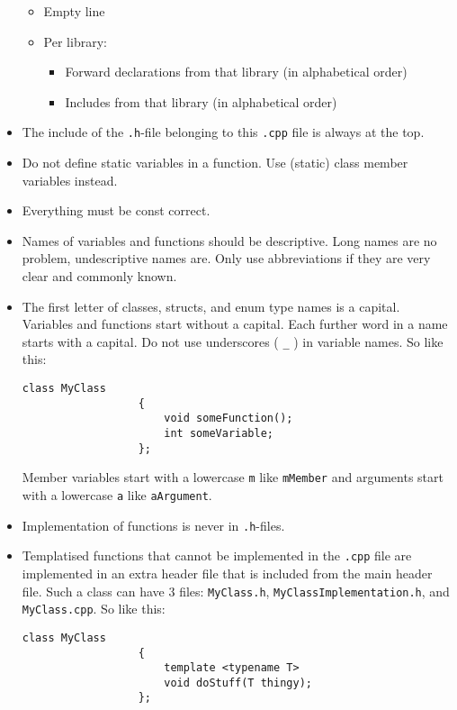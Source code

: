 \documentclass{article}
\begin{document}
\begin{itemize}
\begin{itemize}
              \item Empty line
              \item Per library:
                    \begin{itemize}
                        \item Forward declarations from that library (in alphabetical order)
                        \item Includes from that library (in alphabetical order)
                    \end{itemize}
          \end{itemize}
    \item The include of the \texttt{.h}-file belonging to this \texttt{.cpp} file is always at the top.
    \item Do not define static variables in a function. Use (static) class member variables instead.
    \item Everything must be const correct.
    \item Names of variables and functions should be descriptive. Long names are no problem, undescriptive names are. Only use abbreviations if they are very clear and commonly known.
    \item The first letter of classes, structs, and enum type names is a capital. Variables and functions start without a capital. Each further word in a name starts with a capital. Do not use underscores ( \texttt{\_} ) in variable names. So like this:
          \begin{Verbatim}[fontsize=\small]
              class MyClass
                  {
                      void someFunction();
                      int someVariable;
                  };
          \end{Verbatim}
          Member variables start with a lowercase \texttt{m} like \texttt{mMember} and arguments start with a lowercase \texttt{a} like \texttt{aArgument}.
    \item Implementation of functions is never in \texttt{.h}-files.
    \item Templatised functions that cannot be implemented in the \texttt{.cpp} file are implemented in an extra header file that is included from the main header file. Such a class can have 3 files: \texttt{MyClass.h}, \texttt{MyClassImplementation.h}, and \texttt{MyClass.cpp}. So like this:
          \begin{Verbatim}[fontsize=\small]
              class MyClass
                  {
                      template <typename T>
                      void doStuff(T thingy);
                  };


\end{Verbatim}
\end{itemize}
\end{document}
